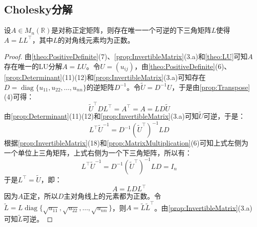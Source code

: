 \subsection{Cholesky分解}
\begin{theorem}\label{theo:Cholesky}
	设$A\in M_{n}(\mathbb{R})$是对称正定矩阵，则存在唯一一个可逆的下三角矩阵$L$使得$A=LL^{\top}$，其中$L$的对角线元素均为正数。
\end{theorem}
\begin{proof}
	由\cref{theo:PositiveDefinite}(7)、\cref{prop:InvertibleMatrix}(3.a)和\cref{theo:LU}可知$A$存在唯一的LU分解$A=LU$。令$U=(u_{ij})$，由\cref{theo:PositiveDefinite}(6)、\cref{prop:Determinant}(11)(12)和\cref{prop:InvertibleMatrix}(3.a)可知存在$D=\operatorname{diag}\{u_{11},u_{22},\dots,u_{nn}\}$的逆矩阵$D^{-1}$。令$\tilde{U}=D^{-1}U$，于是由\cref{prop:Transpose}(4)可得：
	\begin{equation*}
		\tilde{U}^{\top}DL^{\top}=A^{\top}=A=LD\tilde{U}
	\end{equation*}
	由\cref{prop:Determinant}(11)(12)和\cref{prop:InvertibleMatrix}(3.a)可知$\tilde{U}$可逆，于是：
	\begin{equation*}
		L^{\top}\tilde{U}^{-1}=D^{-1}(\tilde{U}^{\top})^{-1}LD
	\end{equation*}
	根据\cref{prop:InvertibleMatrix}(18)和\cref{prop:MatrixMultiplication}(6)可知上式左侧为一个单位上三角矩阵，上式右侧为一个下三角矩阵，所以有：
	\begin{equation*}
		L^{\top}\tilde{U}^{-1}=D^{-1}(\tilde{U}^{\top})^{-1}LD=I_n
	\end{equation*}
	于是$L^{\top}=\tilde{U}$，即：
	\begin{equation*}
		A=LDL^{\top}
	\end{equation*}
	因为$A$正定，所以$D$主对角线上的元素都为正数。令$\tilde{L}=L\operatorname{diag}\{\sqrt{u_{11}},\sqrt{u_{22}},\dots,\sqrt{u_{nn}}\}$，则$A=\tilde{L}\tilde{L}^{\top}$。由\cref{prop:InvertibleMatrix}(3.a)可知$\tilde{L}$可逆。
\end{proof}
